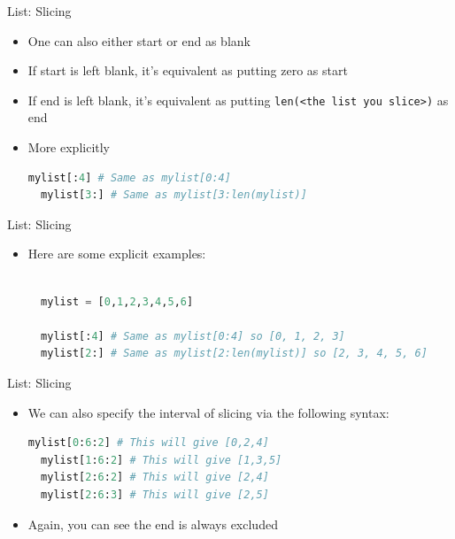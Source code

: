 \documentclass[10pt,xcolor={table,dvipsnames},t]{beamer}
\begin{document}
\begin{frame}[fragile]{List: Slicing}
  \begin{itemize}
    \item One can also either start or end as blank
    \item If start is left blank, it's equivalent as putting zero as start 
    \item If end is left blank, it's equivalent as putting \texttt{len(<the list you slice>)} as end
    \item More explicitly
\begin{lstlisting}[language=python]
  mylist[:4] # Same as mylist[0:4]
  mylist[3:] # Same as mylist[3:len(mylist)]
\end{lstlisting}
  \end{itemize}
  
\end{frame}

\begin{frame}[fragile]{List: Slicing}
  \begin{itemize}
    \item Here are some explicit examples:
\begin{lstlisting}[language=python]

  mylist = [0,1,2,3,4,5,6]
  
  mylist[:4] # Same as mylist[0:4] so [0, 1, 2, 3]
  mylist[2:] # Same as mylist[2:len(mylist)] so [2, 3, 4, 5, 6]
  \end{lstlisting}
  \end{itemize}
\end{frame}

\begin{frame}[fragile]{List: Slicing}
  \begin{itemize}
    \item We can also specify the interval of slicing via the following syntax:
\begin{lstlisting}[language=python]
  mylist[0:6:2] # This will give [0,2,4]
  mylist[1:6:2] # This will give [1,3,5]
  mylist[2:6:2] # This will give [2,4]
  mylist[2:6:3] # This will give [2,5]
\end{lstlisting}
  \item Again, you can see the end is always excluded
  \end{itemize}
\end{frame}
\end{document}
